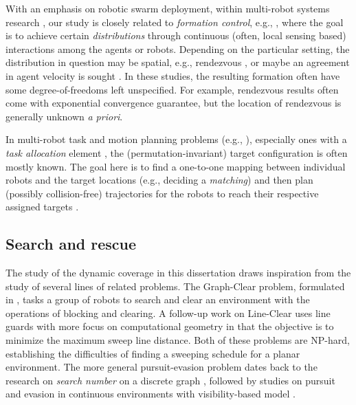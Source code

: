 With an emphasis on robotic swarm deployment, within multi-robot 
systems research \cite{arai2002advances,gerkey2004formal,ren2008distributed,bullo2009distributed}, 
our study is closely related to {\em formation control}, e.g., 
\cite{ando1999distributed,jadbabaie2003coordination,olfati2004consensus,ren2005consensus,cheng2008almost,mesbahi2010graph,yu2012rendezvous},
where the goal is to achieve certain {\em distributions} through 
continuous (often, local sensing based) interactions among the 
agents or robots. Depending on the particular setting, the 
distribution in question may be spatial, e.g., rendezvous
\cite{ando1999distributed,yu2012rendezvous}, or maybe an agreement 
in agent velocity is sought \cite{jadbabaie2003coordination,ren2005consensus}. 
In these studies, the resulting formation often have some 
degree-of-freedoms left unspecified. For example, rendezvous 
results \cite{ando1999distributed,yu2012rendezvous} often come 
with exponential convergence guarantee, but the location of
rendezvous is generally unknown {\em a priori}. 

In multi-robot task and motion planning problems (e.g.,
\cite{smith2009monotonic,ayanian2010decentralized,liu2011multi,liu2013optimal,turpin2014goal,turpin2014capt,alonso2015multi,SolYu15}), 
especially ones with a {\em task allocation} element 
\cite{smith2009monotonic,liu2011multi,liu2013optimal,turpin2014goal,turpin2014capt,SolYu15},
the (permutation-invariant) target configuration is often mostly 
known. The goal here is to find a one-to-one mapping between individual 
robots and the target locations (e.g., deciding a {\em matching}) and 
then plan (possibly collision-free) trajectories for the robots to reach 
their respective assigned targets \cite{turpin2014goal,turpin2014capt,SolYu15}.  

\subsection{Search and rescue}
The study of the dynamic coverage in this dissertation draws inspiration from the study of several 
lines of related problems. 
The Graph-Clear problem, formulated in \cite{kolling2007graph}, tasks a group of robots to search and clear an environment with the operations of blocking and clearing.
A follow-up work on Line-Clear \cite{kolling2017coordinated} uses line guards
with more focus on computational geometry in that
the objective is to minimize the maximum sweep line distance. Both of these problems are
NP-hard, establishing the difficulties of finding a sweeping schedule for a planar environment.
The more general pursuit-evasion problem dates back to the research on \emph{search number}
on a discrete graph \cite{megiddo1988complexity}, 
followed by studies on pursuit and evasion in continuous environments with 
visibility-based model \cite{guibas1999visibility, suzuki1992searching, lavalle2000algorithm, stiffler2017persistent}. 

